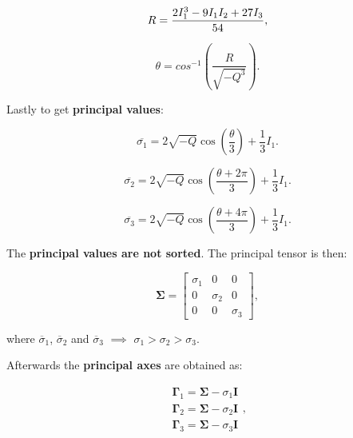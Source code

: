 \documentclass[10pt,b5paper,titlepage]{book}
\begin{document}
\begin{itemize}
        \begin{equation}
            R = \frac{2 I_{1}^{3} - 9 I_{1} I_{2} + 27 I_{3}}{54} \\
        ,\end{equation}

        \begin{equation}
            \theta = cos^{-1} \left( \frac{ R }{ \sqrt{- Q^{3}}} \right)
        .\end{equation}

        Lastly to get \textbf{principal values}:

        \begin{equation}
            \overline{\sigma_{1}}
            = 2 \sqrt{-Q} \cos{\left(\frac{\theta}{3}\right)} + \frac{1}{3}I_{1}
        .\end{equation}

        \begin{equation}
            \overline{\sigma_{2}}
            = 2 \sqrt{-Q} \cos{\left(\frac{\theta + 2 \pi}{3}\right)} + \frac{1}{3}I_{1}
        .\end{equation}

        \begin{equation}
            \overline{\sigma_{3}}
            = 2 \sqrt{-Q} \cos{\left(\frac{\theta + 4 \pi}{3}\right)} + \frac{1}{3}I_{1}
        .\end{equation}

        The \textbf{principal values are not sorted}. The principal tensor is then:

        \begin{equation}
            \mathbf{\Sigma} = \begin{bmatrix}
                \sigma_{1} & 0 & 0 \\
                0 & \sigma_{2}  & 0 \\
                0 & 0 & \sigma_{3}
            \end{bmatrix}
        ,\end{equation}

        where $\overline{\sigma}_{1}$, $\overline{\sigma}_{2}$ and $\overline{\sigma}_{3}$
        $\implies$ $\sigma_1 > \sigma_2 > \sigma_3$.

        Afterwards the \textbf{principal axes} are obtained as:

        \begin{equation}
            \begin{array}{l}
                \mathbf{\Gamma}_{1} = \mathbf{\Sigma} - \sigma_{1}\mathbf{I} \\
                \mathbf{\Gamma}_{2} = \mathbf{\Sigma} - \sigma_{2}\mathbf{I} \\
                \mathbf{\Gamma}_{3} = \mathbf{\Sigma} - \sigma_{3}\mathbf{I}
            \end{array}
        ,\end{equation}


\end{itemize}
\end{document}
